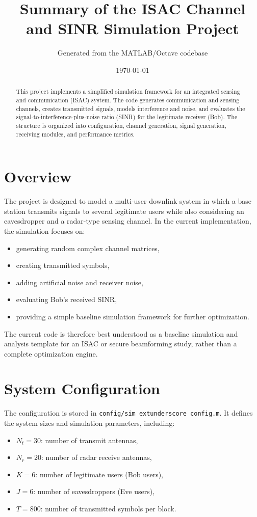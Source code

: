 \documentclass[12pt]{article}
\title{Summary of the ISAC Channel and SINR Simulation Project}
\author{Generated from the MATLAB/Octave codebase}
\date{\today}
\begin{document}
\maketitle

\begin{abstract}
This project implements a simplified simulation framework for an integrated sensing and communication (ISAC) system. The code generates communication and sensing channels, creates transmitted signals, models interference and noise, and evaluates the signal-to-interference-plus-noise ratio (SINR) for the legitimate receiver (Bob). The structure is organized into configuration, channel generation, signal generation, receiving modules, and performance metrics.
\end{abstract}

\section{Overview}
The project is designed to model a multi-user downlink system in which a base station transmits signals to several legitimate users while also considering an eavesdropper and a radar-type sensing channel. In the current implementation, the simulation focuses on:

\begin{itemize}[leftmargin=*]
    \item generating random complex channel matrices,
    \item creating transmitted symbols,
    \item adding artificial noise and receiver noise,
    \item evaluating Bob's received SINR,
    \item providing a simple baseline simulation framework for further optimization.
\end{itemize}

The current code is therefore best understood as a baseline simulation and analysis template for an ISAC or secure beamforming study, rather than a complete optimization engine.

\section{System Configuration}
The configuration is stored in \texttt{config/sim	extunderscore config.m}. It defines the system sizes and simulation parameters, including:

\begin{itemize}[leftmargin=*]
    \item $N_t = 30$: number of transmit antennas,
    \item $N_r = 20$: number of radar receive antennas,
    \item $K = 6$: number of legitimate users (Bob users),
    \item $J = 6$: number of eavesdroppers (Eve users),
    \item $T = 800$: number of transmitted symbols per block.
\end{itemize}
\end{document}

